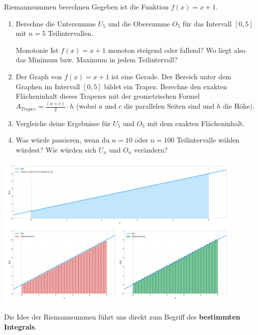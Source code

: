 \begin{aufgabenumgebung}{Riemannsummen berechnen}
Gegeben ist die Funktion $f(x) = x+1$.
\begin{enumerate}
    \item Berechne die Untersumme $U_5$ und die Obersumme $O_5$ für das Intervall $[0,5]$ mit $n=5$ Teilintervallen.
    \begin{tippumgebung}{Monotonie}
    Ist $f(x)=x+1$ monoton steigend oder fallend? Wo liegt also das Minimum bzw. Maximum in jedem Teilintervall?
    \end{tippumgebung}
    \item Der Graph von $f(x)=x+1$ ist eine Gerade. Der Bereich unter dem Graphen im Intervall $[0,5]$ bildet ein Trapez. Berechne den exakten Flächeninhalt dieses Trapezes mit der geometrischen Formel $A_{Trapez} = \frac{(a+c)}{2} \cdot h$ (wobei $a$ und $c$ die parallelen Seiten sind und $h$ die Höhe).
    \item Vergleiche deine Ergebnisse für $U_5$ und $O_5$ mit dem exakten Flächeninhalt.
    \item Was würde passieren, wenn du $n=10$ oder $n=100$ Teilintervalle wählen würdest? Wie würden sich $U_n$ und $O_n$ verändern?
\end{enumerate}

\begin{center}
    \includegraphics[width=0.9\textwidth]{grafiken/Riemannsummen_lineareFunktion.png}
    \label{fig:riemannsummen_linear_illustration}
\end{center}
\end{aufgabenumgebung}

Die Idee der Riemannsummen führt uns direkt zum Begriff des \textbf{bestimmten Integrals}.

